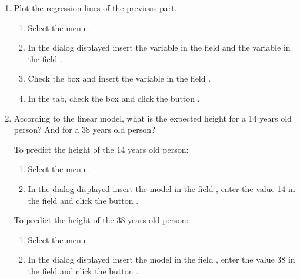 \begin{enumerate}[leftmargin=*]
\begin{enumerate}
\item Plot the regression lines of the previous part.
\begin{indication}
\begin{enumerate}
\item Select the menu .
\item In the dialog displayed insert the variable  in the field  and
the variable  in the field .
\item Check the box  and insert the variable  in the field
.
\item In the  tab, check the box  and click the button .
\end{enumerate}
\end{indication}

\item According to the linear model, what is the expected height for a 14 years old person? And for a 38 years old
person?
\begin{indication}
To predict the height of the 14 years old person:
\begin{enumerate}
\item Select the menu .
\item In the dialog displayed insert the model  in the field
, enter the value 14 in the field  and click the button .
\end{enumerate}
To predict the height of the 38 years old person:
\begin{enumerate}
\item Select the menu .
\item In the dialog displayed insert the model  in the field
, enter the value 38 in the field  and click the button .
\end{enumerate}
\end{indication}
\end{enumerate}


\end{enumerate}
